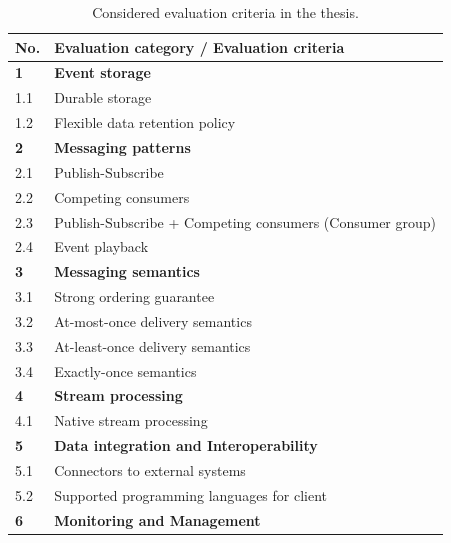 \begin{table}[h]
	\centering
	\caption{Considered evaluation criteria in the thesis.}
	\label{table:criteria}
	\begin{tabular}{|l|l|}
		\hline
		\textbf{No.} & \textbf{Evaluation category / Evaluation criteria}       \\ \hline
		\textbf{1}   & \textbf{Event storage}                                   \\ \hline
		1.1          & Durable storage                                          \\ \hline
		1.2          & Flexible data retention policy                           \\ \hline
		\textbf{2}   & \textbf{Messaging patterns}                              \\ \hline
		2.1          & Publish-Subscribe                                        \\ \hline
		2.2          & Competing consumers                                      \\ \hline
		2.3          & Publish-Subscribe + Competing consumers (Consumer group) \\ \hline
		2.4          & Event playback                                           \\ \hline
		\textbf{3}   & \textbf{Messaging semantics}                             \\ \hline
		3.1          & Strong ordering guarantee                                \\ \hline
		3.2          & At-most-once delivery semantics                          \\ \hline
		3.3          & At-least-once delivery semantics                         \\ \hline
		3.4          & Exactly-once semantics                                   \\ \hline
		\textbf{4}   & \textbf{Stream processing}                               \\ \hline
		4.1          & Native stream processing                                 \\ \hline
		\textbf{5}   & \textbf{Data integration and Interoperability}           \\ \hline
		5.1          & Connectors to external systems                           \\ \hline
		5.2          & Supported programming languages for client               \\ \hline
		\textbf{6}   & \textbf{Monitoring and Management}                       \\ \hline

\end{tabular}
\end{table}
